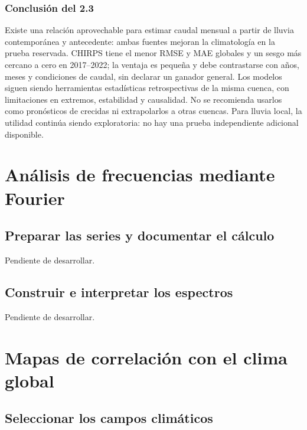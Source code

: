 \documentclass[10pt,a4paper]{article}
\begin{document}
\subsubsection*{Conclusión del 2.3}
Existe una relación aprovechable para estimar caudal mensual a partir de lluvia contemporánea y antecedente: ambas fuentes mejoran la climatología en la prueba reservada. CHIRPS tiene el menor RMSE y MAE globales y un sesgo más cercano a cero en 2017--2022; la ventaja es pequeña y debe contrastarse con años, meses y condiciones de caudal, sin declarar un ganador general. Los modelos siguen siendo herramientas estadísticas retrospectivas de la misma cuenca, con limitaciones en extremos, estabilidad y causalidad. No se recomienda usarlos como pronósticos de crecidas ni extrapolarlos a otras cuencas. Para lluvia local, la utilidad continúa siendo exploratoria: no hay una prueba independiente adicional disponible.
\clearpage

\section{Análisis de frecuencias mediante Fourier}
\subsection{Preparar las series y documentar el cálculo}
Pendiente de desarrollar.
\subsection{Construir e interpretar los espectros}
Pendiente de desarrollar.
\clearpage
\section{Mapas de correlación con el clima global}
\subsection{Seleccionar los campos climáticos}
\end{document}
